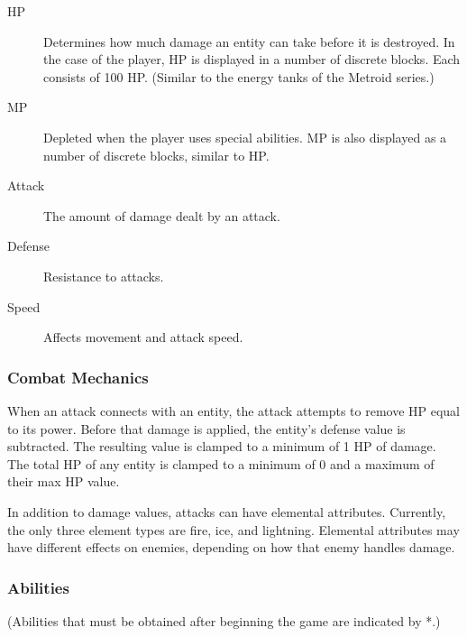 \documentclass{article}
\begin{document}
\begin{description}

\item[HP]
Determines how much damage an entity can take before it is destroyed.  In the case of the player, HP is displayed in a number of discrete blocks.  Each consists of 100 HP.  (Similar to the energy tanks of the Metroid series.)

\item[MP]
Depleted when the player uses special abilities.  MP is also displayed as a number of discrete blocks, similar to HP.

\item[Attack]
The amount of damage dealt by an attack.

\item[Defense]
Resistance to attacks.

\item[Speed]
Affects movement and attack speed.

\end{description}

\label{CombatMechanics}
\subsubsection{Combat Mechanics}

When an attack connects with an entity, the attack attempts to remove HP equal to its power.  Before that damage is applied, the entity's defense value is subtracted.  The resulting value is clamped to a minimum of 1 HP of damage.  The total HP of any entity is clamped to a minimum of 0 and a maximum of their max HP value.

In addition to damage values, attacks can have elemental attributes.  Currently, the only three element types are fire, ice, and lightning.  Elemental attributes may have different effects on enemies, depending on how that enemy handles damage.

\label{AbilitiesSection}
\subsubsection{Abilities}
(Abilities that must be obtained after beginning the game are indicated by *.)
\end{document}
